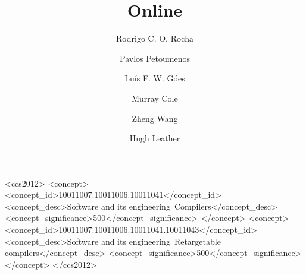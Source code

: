 \documentclass[sigplan,review,anonymous]{acmart}\settopmatter{printfolios=true,printccs=false,printacmref=false}
\begin{document}
\title{Online {\IterComp}}

\author{Rodrigo C. O. Rocha}

\author{Pavlos Petoumenos}

\author{Lu\'is F. W. G\'oes}

\author{Murray Cole}

\author{Zheng Wang}

\author{Hugh Leather}

\renewcommand{\shortauthors}{R. Rocha et al.}



%
%
\begin{CCSXML}
<ccs2012>
<concept>
<concept_id>10011007.10011006.10011041</concept_id>
<concept_desc>Software and its engineering~Compilers</concept_desc>
<concept_significance>500</concept_significance>
</concept>
<concept>
<concept_id>10011007.10011006.10011041.10011043</concept_id>
<concept_desc>Software and its engineering~Retargetable compilers</concept_desc>
<concept_significance>500</concept_significance>
</concept>
</ccs2012>
\end{CCSXML}


\maketitle
\vspace{-1em}





%





%
%



\end{document}
